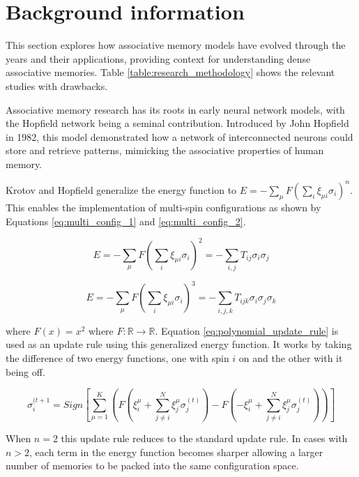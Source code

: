 \documentclass[preprint,12pt]{elsarticle}
\begin{document}
\section{Background information}\label{related}
This section explores how associative memory models have evolved through the years and their applications, providing context for understanding dense associative memories. Table \ref{table:research_methodology} shows the relevant studies with drawbacks.

Associative memory research has its roots in early neural network models, with the Hopfield network \cite{hopfield_orig} being a seminal contribution. Introduced by John Hopfield in 1982, this model demonstrated how a network of interconnected neurons could store and retrieve patterns, mimicking the associative properties of human memory.

Krotov and Hopfield \cite{polynomial_DAM} generalize the energy function to $E = -\sum_{\mu}F(\sum_i\xi_{\mu i}\sigma_i)^n$. This enables the implementation of multi-spin configurations as shown by Equations \ref{eq:multi_config_1} and \ref{eq:multi_config_2}.

\begin{equation}
    E = -\sum_{\mu}F(\sum_i\xi_{\mu i}\sigma_i)^2 = -\sum_{i,j} T_{ij}\sigma_i\sigma_j
    \label{eq:multi_config_1}
\end{equation}

\begin{equation}
    E = -\sum_{\mu}F(\sum_i\xi_{\mu i}\sigma_i)^3 = -\sum_{i,j,k} T_{ijk}\sigma_i\sigma_j\sigma_k
    \label{eq:multi_config_2}
\end{equation}

where $F(x) = x^2$ where $F: \mathbb{R} \rightarrow \mathbb{R}$. Equation \ref{eq:polynomial_update_rule} is used as an update rule using this generalized energy function. It works by taking the difference of two energy functions, one with spin $i$ on and the other with it being off.

\begin{equation*}
    \sigma_{i}^{(t+1} = Sign\left[ \sum_{\mu = 1}^{K} \left( F\left( \xi_{i}^{\mu} + \sum_{j\neq i}^{N} \xi_{j}^{\mu} \sigma_{j}^{(t)} \right) - F\left( -\xi_{i}^{\mu} + \sum_{j\neq i}^{N} \xi_{j}^{\mu} \sigma_{j}^{(t)} \right) \right) \right]
    \label{eq:polynomial_update_rule}
\end{equation*}

When $n = 2$ this update rule reduces to the standard update rule. In cases with $n > 2$, each term in the energy function becomes sharper allowing a larger number of memories to be packed into the same configuration space.
\end{document}
